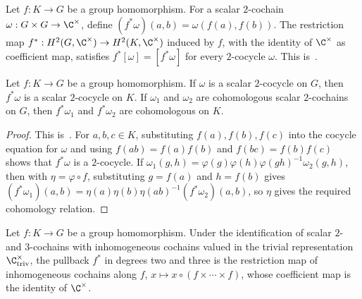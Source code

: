 \begin{definition}
    \label{def:mpug_h2_pullback}
    \leanok
    Let $f:K\to G$ be a group homomorphism. For a scalar $2$-cochain
    $\omega:G\times G\to\C^\times$, define
    $(f^*\omega)(a,b)=\omega(f(a),f(b))$.
    The restriction map
    $f^*:H^2(G,\C^\times)\to H^2(K,\C^\times)$ induced by $f$, with the
    identity of $\C^\times$ as coefficient map, satisfies
    $f^*[\omega]=[f^*\omega]$ for every $2$-cocycle $\omega$.
    This is~\cite[``Pullback of scalar cohomology'']{QICLean2026Blueprint}.
\end{definition}

\begin{lemma}
    \label{thm:mpug_h2_pullback_preserves}
    \leanok
    Let $f:K\to G$ be a group homomorphism. If $\omega$ is a scalar
    $2$-cocycle on $G$, then $f^*\omega$ is a scalar $2$-cocycle on $K$.
    If $\omega_1$ and $\omega_2$ are cohomologous scalar $2$-cochains on $G$,
    then $f^*\omega_1$ and $f^*\omega_2$ are cohomologous on $K$.
\end{lemma}

\begin{proof}\leanok
    This is~\cite[``Pullback preserves cocycles and
        cohomology'']{QICLean2026Blueprint}.
    For $a,b,c\in K$, substituting $f(a),f(b),f(c)$ into the cocycle equation
    for $\omega$ and using $f(ab)=f(a)f(b)$ and $f(bc)=f(b)f(c)$ shows that
    $f^*\omega$ is a $2$-cocycle.
    If $\omega_1(g,h)=\varphi(g)\varphi(h)\varphi(gh)^{-1}\omega_2(g,h)$,
    then with $\eta=\varphi\circ f$, substituting $g=f(a)$ and $h=f(b)$ gives
    $(f^*\omega_1)(a,b)=\eta(a)\eta(b)\eta(ab)^{-1}(f^*\omega_2)(a,b)$,
    so $\eta$ gives the required cohomology relation.
\end{proof}

\begin{lemma}
    \label{lem:mpug_restriction_inhomogeneous}
    \leanok
    Let $f:K\to G$ be a group homomorphism. Under the identification of scalar
    $2$- and $3$-cochains with inhomogeneous cochains valued in the trivial
    representation $\C^\times_{\mathrm{triv}}$, the pullback $f^*$ in degrees
    two and three is the restriction map of inhomogeneous cochains along $f$,
    $x\mapsto x\circ(f\times\cdots\times f)$, whose coefficient map is the
    identity of $\C^\times$.
\end{lemma}

